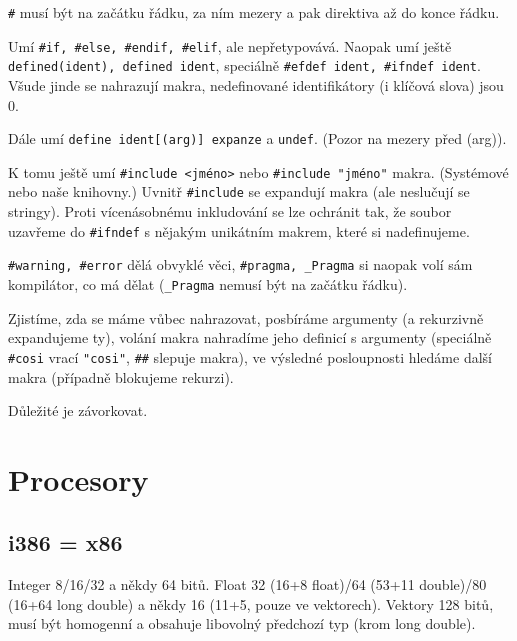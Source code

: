 \documentclass[12pt]{article}                   %
\begin{document}
    \begin{definice}
        \verb|#| musí být na začátku řádku, za ním mezery a pak direktiva až do konce řádku.

        Umí \verb|#if, #else, #endif, #elif|, ale nepřetypovává. Naopak umí ještě \verb|defined(ident), defined ident|, speciálně \verb|#efdef ident, #ifndef ident|. Všude jinde se nahrazují makra, nedefinované identifikátory (i klíčová slova) jsou 0.

        Dále umí \verb|define ident[(arg)] expanze| a \verb|undef|. (Pozor na mezery před (arg)).

        K tomu ještě umí \verb|#include <jméno>| nebo \verb|#include "jméno"| makra. (Systémové nebo naše knihovny.) Uvnitř \verb|#include| se expandují makra (ale neslučují se stringy). Proti vícenásobnému inkludování se lze ochránit tak, že soubor uzavřeme do \verb|#ifndef| s nějakým unikátním makrem, které si nadefinujeme.

        \verb|#warning, #error| dělá obvyklé věci, \verb|#pragma, _Pragma| si naopak volí sám kompilátor, co má dělat (\verb|_Pragma| nemusí být na začátku řádku).
    \end{definice}

    \begin{definice}
        Zjistíme, zda se máme vůbec nahrazovat, posbíráme argumenty (a rekurzivně expandujeme ty), volání makra nahradíme jeho definicí s argumenty (speciálně \verb|#cosi| vrací \verb|"cosi"|, \verb|##| slepuje makra), ve výsledné posloupnosti hledáme další makra (případně blokujeme rekurzi).
    \end{definice}

    \begin{upozorneni}
        Důležité je závorkovat.
    \end{upozorneni}


\section{Procesory}
    \subsection{i386 = x86}
        \begin{definice}
            Integer 8/16/32 a někdy 64 bitů. Float 32 (16+8 float)/64 (53+11 double)/80 (16+64 long double) a někdy 16 (11+5, pouze ve vektorech). Vektory 128 bitů, musí být homogenní a obsahuje libovolný předchozí typ (krom long double).
        \end{definice}
\end{document}
